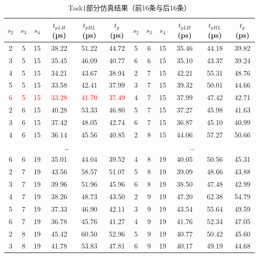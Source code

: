 \documentclass[UTF8,12pt,a4paper]{ctexart}
\begin{document}
\begin{table}[htbp]
    \centering
    \caption{Task1部分仿真结果（前16条与后16条）}
    \label{tab:task1_results}
    \begin{tabular}{cccccc|cccccc}
        \toprule
        $s_2$ & $s_3$ & $s_4$ & $t_{pLH}$(ps) & $t_{pHL}$(ps) & $t_p$(ps) & $s_2$ & $s_3$ & $s_4$ & $t_{pLH}$(ps) & $t_{pHL}$(ps) & $t_p$(ps) \\
        \midrule
        2 & 5 & 15 & 38.22 & 51.22 & 44.72 & 5 & 6 & 15 & 35.46 & 44.18 & 39.82 \\
        3 & 5 & 15 & 35.45 & 46.09 & 40.77 & 6 & 6 & 15 & 35.10 & 43.37 & 39.24 \\
        4 & 5 & 15 & 34.21 & 43.67 & 38.94 & 2 & 7 & 15 & 42.21 & 55.31 & 48.76 \\
        5 & 5 & 15 & 33.58 & 42.41 & 37.99 & 3 & 7 & 15 & 39.32 & 50.01 & 44.66 \\
        \textcolor{red}{6} & \textcolor{red}{5} & \textcolor{red}{15} & \textcolor{red}{33.28} & \textcolor{red}{41.70} & \textcolor{red}{37.49} & 4 & 7 & 15 & 37.99 & 47.42 & 42.71 \\
        2 & 6 & 15 & 40.28 & 53.33 & 46.80 & 5 & 7 & 15 & 37.27 & 45.98 & 41.63 \\
        3 & 6 & 15 & 37.42 & 48.05 & 42.74 & 6 & 7 & 15 & 36.87 & 45.10 & 40.99 \\
        4 & 6 & 15 & 36.14 & 45.56 & 40.85 & 2 & 8 & 15 & 44.06 & 57.27 & 50.66 \\
        \midrule
        \multicolumn{6}{c}{\dots} & \multicolumn{6}{c}{\dots} \\
        \midrule
        6 & 6 & 19 & 35.01 & 44.04 & 39.52 & 4 & 8 & 19 & 40.05 & 50.56 & 45.31 \\
        2 & 7 & 19 & 43.56 & 58.57 & 51.07 & 5 & 8 & 19 & 39.09 & 48.66 & 43.88 \\
        3 & 7 & 19 & 39.96 & 51.96 & 45.96 & 6 & 8 & 19 & 38.50 & 47.48 & 42.99 \\
        4 & 7 & 19 & 38.26 & 48.73 & 43.50 & 2 & 9 & 19 & 47.20 & 62.38 & 54.79 \\
        5 & 7 & 19 & 37.33 & 46.90 & 42.11 & 3 & 9 & 19 & 43.54 & 55.64 & 49.59 \\
        6 & 7 & 19 & 36.78 & 45.76 & 41.27 & 4 & 9 & 19 & 41.76 & 52.34 & 47.05 \\
        2 & 8 & 19 & 45.42 & 60.50 & 52.96 & 5 & 9 & 19 & 40.77 & 50.42 & 45.60 \\
        3 & 8 & 19 & 41.78 & 53.83 & 47.81 & 6 & 9 & 19 & 40.17 & 49.19 & 44.68 \\
        \bottomrule
    \end{tabular}
\end{table}
\end{document}
